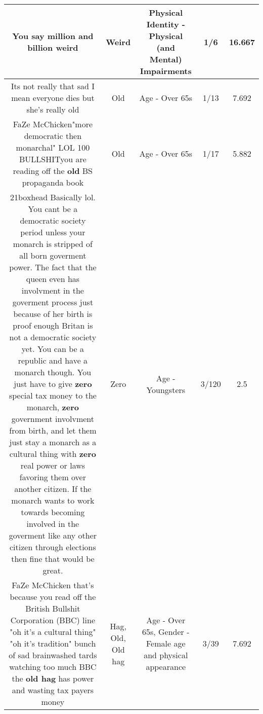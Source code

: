 \documentclass[11pt]{article}
\newlength\mylength
\begin{document}
\begin{center}
\begin{longtable}{|C{.65\mylength}|C{.30\mylength}|C{.12\mylength}|C{.12\mylength}|C{.12\mylength}|}
  \small You say million and billion weird\normalsize   & Weird & Physical Identity - Physical (and Mental) Impairments & 1/6 & 16.667 \\  \hline
  \small Its not really that sad I mean everyone dies but she's really old\normalsize   & Old & Age - Over 65s & 1/13 & 7.692 \\  \hline
  \small FaZe McChicken"more democratic then monarchal" LOL 100 BULLSHITyou are reading off the \textbf{old} BS propaganda book\normalsize   & Old & Age - Over 65s & 1/17 & 5.882 \\  \hline
  \small 21boxhead Basically lol. You cant be a democratic society period unless your monarch is stripped of all born goverment power. The fact that the queen even has involvment in the goverment process just because of her birth is proof enough Britan is not a democratic society yet. You can be a republic and have a monarch though. You just have to give \textbf{zero} special tax money to the monarch, \textbf{zero} government involvment from birth, and let them just stay a monarch as a cultural thing with \textbf{zero} real power or laws favoring them over another citizen. If the monarch wants to work towards becoming involved in the goverment like any other citizen through elections then fine that would be great.\normalsize   & Zero & Age - Youngsters & 3/120 & 2.5 \\  \hline
  \small FaZe McChicken that's because you read off the British Bullshit Corporation (BBC) line "oh it's a cultural thing" "oh it's tradition" bunch of sad brainwashed tards watching too much BBC the \textbf{o\textbf{ld} h\textbf{ag}} has power and wasting tax payers money\normalsize   & Hag, Old, Old hag & Age - Over 65s, Gender - Female age and physical appearance & 3/39 & 7.692 \\  \hline

\end{longtable}
\end{center}
\end{document}
